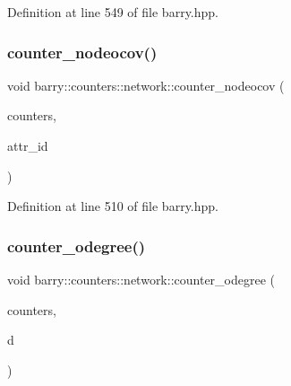 Definition at line 549 of file barry.\+hpp.

\mbox{\label{namespacebarry_1_1counters_1_1network_a2804cd2dba633fdccc7a1ca6a15bdf47}} 
\subsubsection{\texorpdfstring{counter\+\_\+nodeocov()}{counter\_nodeocov()}}
{\footnotesize\ttfamily void barry\+::counters\+::network\+::counter\+\_\+nodeocov (\begin{DoxyParamCaption}\item[{\hyperlink{namespacebarry_1_1counters_1_1network_a3b3c590303d47840d1967372ae495d95}{Net\+Counter\+Vector} $\ast$}]{counters,  }\item[{\hyperlink{namespacebarry_a11dfc53ddb4672278319aa04f1e09a6c}{uint}}]{attr\+\_\+id }\end{DoxyParamCaption})\hspace{0.3cm}{\ttfamily [inline]}}



Definition at line 510 of file barry.\+hpp.

\mbox{\label{namespacebarry_1_1counters_1_1network_af679a51acdd35805c7c40748af65c0f4}} 
\subsubsection{\texorpdfstring{counter\+\_\+odegree()}{counter\_odegree()}}
{\footnotesize\ttfamily void barry\+::counters\+::network\+::counter\+\_\+odegree (\begin{DoxyParamCaption}\item[{\hyperlink{namespacebarry_1_1counters_1_1network_a3b3c590303d47840d1967372ae495d95}{Net\+Counter\+Vector} $\ast$}]{counters,  }\item[{std\+::vector$<$ \hyperlink{namespacebarry_a11dfc53ddb4672278319aa04f1e09a6c}{uint} $>$}]{d }\end{DoxyParamCaption})\hspace{0.3cm}{\ttfamily [inline]}}



